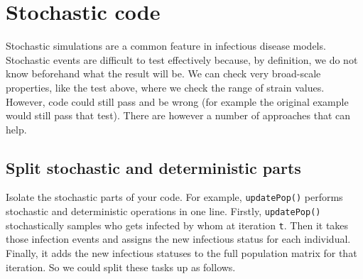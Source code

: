 \documentclass[10pt,letterpaper]{article}
\newenvironment{Shaded}{\begin{snugshade}}{\end{snugshade}}
\newcommand{\CommentTok}[1]{\textcolor[rgb]{0.56,0.35,0.01}{\textit{#1}}}
\newcommand{\ControlFlowTok}[1]{\textcolor[rgb]{0.13,0.29,0.53}{\textbf{#1}}}
\newcommand{\DataTypeTok}[1]{\textcolor[rgb]{0.13,0.29,0.53}{#1}}
\newcommand{\DecValTok}[1]{\textcolor[rgb]{0.00,0.00,0.81}{#1}}
\newcommand{\KeywordTok}[1]{\textcolor[rgb]{0.13,0.29,0.53}{\textbf{#1}}}
\newcommand{\NormalTok}[1]{#1}
\newcommand{\OperatorTok}[1]{\textcolor[rgb]{0.81,0.36,0.00}{\textbf{#1}}}
\newcommand{\StringTok}[1]{\textcolor[rgb]{0.31,0.60,0.02}{#1}}
\begin{document}
\begin{Shaded}
\end{Shaded}

\hypertarget{stochastic-code}{%
\section{Stochastic code}\label{stochastic-code}}

Stochastic simulations are a common feature in infectious disease models.
Stochastic events are difficult to test effectively because, by definition, we do not know beforehand what the result will be.
We can check very broad-scale properties, like the test above, where we check the range of strain values.
However, code could still pass and be wrong (for example the original example would still pass that test).
There are however a number of approaches that can help.

\hypertarget{splitstochastic}{%
\subsection*{Split stochastic and deterministic parts}\label{splitstochastic}}

Isolate the stochastic parts of your code.
For example, \texttt{updatePop()} performs stochastic and deterministic operations in one line.
Firstly, \texttt{updatePop()} stochastically samples who gets infected by whom at iteration \texttt{t}.
Then it takes those infection events and assigns the new infectious status for each individual.
Finally, it adds the new infectious statuses to the full population matrix for that iteration.
So we could split these tasks up as follows.
\newline
{}\label{split_deter_stoch}
\end{document}

